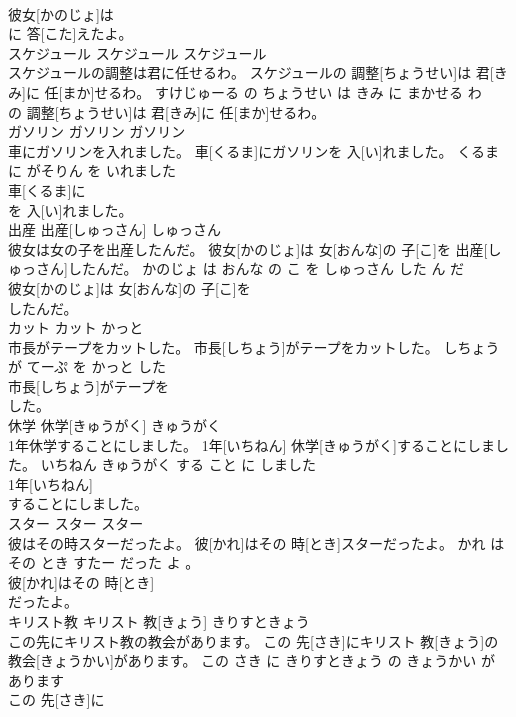 \documentclass[8pt]{extreport}
\begin{document}
\begin{CJK}{UTF8}{min}
\\	彼女[かのじょ]は
\\	に 答[こた]えたよ。			
\\	スケジュール	スケジュール	スケジュール	
\\	スケジュールの調整は君に任せるわ。	スケジュールの 調整[ちょうせい]は 君[きみ]に 任[まか]せるわ。	すけじゅーる の ちょうせい は きみ に まかせる わ	
\\	の 調整[ちょうせい]は 君[きみ]に 任[まか]せるわ。			
\\	ガソリン	ガソリン	ガソリン	
\\	車にガソリンを入れました。	車[くるま]にガソリンを 入[い]れました。	くるま に がそりん を いれました	
\\	車[くるま]に
\\	を 入[い]れました。			
\\	出産	出産[しゅっさん]	しゅっさん	
\\	彼女は女の子を出産したんだ。	彼女[かのじょ]は 女[おんな]の 子[こ]を 出産[しゅっさん]したんだ。	かのじょ は おんな の こ を しゅっさん した ん だ	
\\	彼女[かのじょ]は 女[おんな]の 子[こ]を
\\	したんだ。			
\\	カット	カット	かっと	
\\	市長がテープをカットした。	市長[しちょう]がテープをカットした。	しちょう が てーぷ を かっと した	
\\	市長[しちょう]がテープを
\\	した。			
\\	休学	休学[きゅうがく]	きゅうがく	
\\	1年休学することにしました。	1年[いちねん] 休学[きゅうがく]することにしました。	いちねん きゅうがく する こと に しました	
\\	1年[いちねん]
\\	することにしました。			
\\	スター	スター	スター	
\\	彼はその時スターだったよ。	彼[かれ]はその 時[とき]スターだったよ。	かれ は その とき すたー だった よ 。	
\\	彼[かれ]はその 時[とき]
\\	だったよ。			
\\	キリスト教	キリスト 教[きょう]	きりすときょう	
\\	この先にキリスト教の教会があります。	この 先[さき]にキリスト 教[きょう]の 教会[きょうかい]があります。	この さき に きりすときょう の きょうかい が あります	
\\	この 先[さき]に

\end{CJK}
\end{document}

